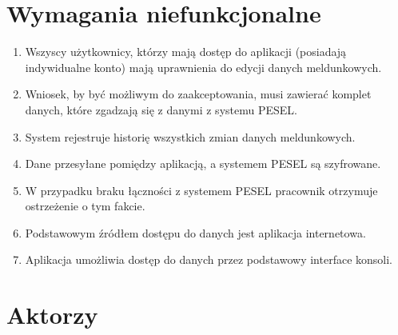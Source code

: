 \documentclass[12pt]{article}
\begin{document}
\section{Wymagania niefunkcjonalne}
\begin{enumerate}
    \item Wszyscy użytkownicy, którzy mają dostęp do aplikacji (posiadają indywidualne konto) mają uprawnienia do edycji danych meldunkowych.
    \item Wniosek, by być możliwym do zaakceptowania, musi zawierać komplet danych, które zgadzają się z danymi z systemu PESEL.    
    \item System rejestruje historię wszystkich zmian danych meldunkowych.
    \item Dane przesyłane pomiędzy aplikacją, a systemem PESEL są szyfrowane.
    \item W przypadku braku łączności z systemem PESEL pracownik otrzymuje ostrzeżenie o tym fakcie.
    \item Podstawowym źródłem dostępu do danych jest aplikacja internetowa.
    \item Aplikacja umożliwia dostęp do danych przez podstawowy interface konsoli.
\end{enumerate}
\newpage

\section{Aktorzy}
\end{document}
